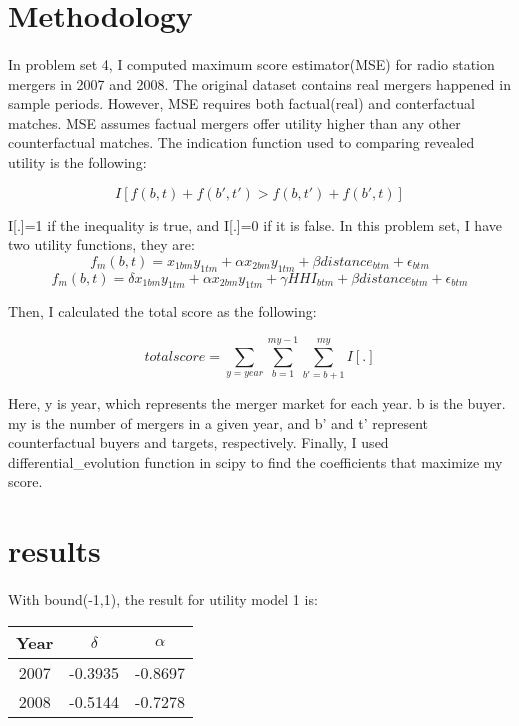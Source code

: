 \documentclass[12pt]{article}
\begin{document}
\section{Methodology}
\paragraph{}
In problem set 4, I computed maximum score estimator(MSE) for radio station mergers in 2007 and 2008. The original dataset contains real mergers happened in sample periods. However, MSE requires both factual(real) and conterfactual matches. MSE assumes factual mergers offer utility higher than any other counterfactual matches. The indication function used to comparing revealed utility is the following:
	
\begin{equation}
I[f(b,t)+f(b',t')>f(b,t')+f(b',t)]
\end{equation}

	I[.]=1 if the inequality is true, and I[.]=0 if it is false. 
	In this problem set, I have two utility functions, they are:
\begin{equation}
f_m(b,t)=x_{1bm}y_{1tm}+\alpha x_{2bm}y_{1tm}+\beta distance_{btm}+\epsilon_{btm}
\end{equation}
\begin{equation}
f_m(b,t)=\delta x_{1bm}y_{1tm}+\alpha x_{2bm}y_{1tm}+\gamma HHI_{btm}+\beta distance_{btm}+\epsilon_{btm}
\end{equation}

	Then, I calculated the total score as the following:

\begin{equation}
total score=\sum\limits_{y=year}\sum\limits_{b=1}^{my-1}\sum\limits_{b'=b+1}^{my} I[.]
\end{equation}

	Here, y is year, which represents the merger market for each year. b is the buyer. my is the number of mergers in a given year, and b' and t' represent counterfactual buyers and targets, respectively. 
	Finally, I used differential\_evolution function in scipy to find the coefficients that maximize my score.
\section{results}
\paragraph{}
With bound(-1,1), the result for utility model 1 is:
\begin{center}
	\begin{tabular}{||c c c ||} 
		\hline
		Year & $\delta$ & $\alpha$ \\ [0.5ex] 
		\hline\hline
		2007 & -0.3935 & -0.8697  \\ 
		 \hline
		2008 & -0.5144 & -0.7278  \\ [1ex] 
		\hline
	\end{tabular}
\end{center}
\end{document}
